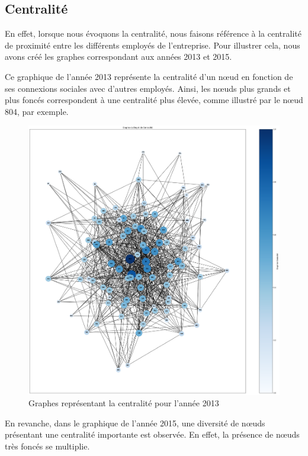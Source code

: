 \documentclass{article}
\begin{document}
\subsection{Centralité}
En effet, lorsque nous évoquons la centralité, nous faisons référence à la centralité de proximité entre les différents employés de l'entreprise. Pour illustrer cela, nous avons créé les graphes correspondant aux années 2013 et 2015.


Ce graphique de l'année 2013 représente la centralité d'un nœud en fonction de ses connexions sociales avec d'autres employés. Ainsi, les nœuds plus grands et plus foncés correspondent à une centralité plus élevée, comme illustré par le nœud 804, par exemple.

\begin{figure}[h]
    \centering
    \includegraphics[width=16.4cm]{assets/centralite/deg_centralite_2013.png}
    \caption{Graphes représentant la centralité pour l'année 2013}
    \label{fig:deg_centralite_2013}
\end{figure}


En revanche, dans le graphique de l'année 2015, une diversité de nœuds présentant une centralité importante est observée. En effet, la présence de nœuds très foncés se multiplie.
\end{document}
